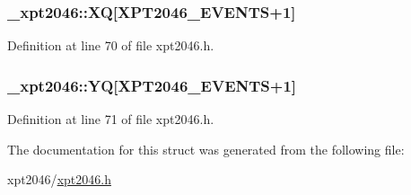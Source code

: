 \subsubsection[{\texorpdfstring{XQ}{XQ}}]{ \+\_\+xpt2046\+::\+XQ\mbox{[}{\bf X\+P\+T2046\+\_\+\+E\+V\+E\+N\+TS}+1\mbox{]}}\hypertarget{struct__xpt2046_ac3f7953dda5a05a52276892bee461a29}{}\label{struct__xpt2046_ac3f7953dda5a05a52276892bee461a29}


Definition at line 70 of file xpt2046.\+h.

\subsubsection[{\texorpdfstring{YQ}{YQ}}]{ \+\_\+xpt2046\+::\+YQ\mbox{[}{\bf X\+P\+T2046\+\_\+\+E\+V\+E\+N\+TS}+1\mbox{]}}\hypertarget{struct__xpt2046_a0a1b0401066322d653135eb8db55d198}{}\label{struct__xpt2046_a0a1b0401066322d653135eb8db55d198}


Definition at line 71 of file xpt2046.\+h.



The documentation for this struct was generated from the following file\+:\begin{DoxyCompactItemize}
\item 
xpt2046/\hyperlink{xpt2046_8h}{xpt2046.\+h}\end{DoxyCompactItemize}
